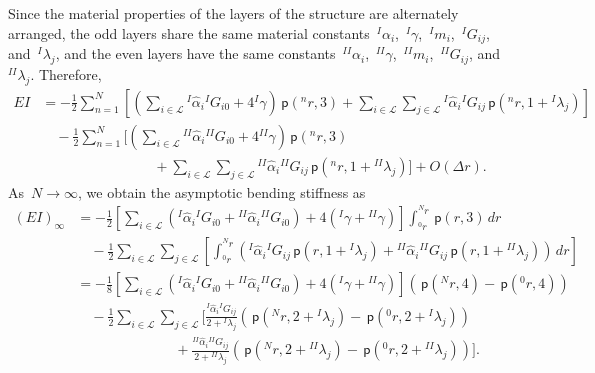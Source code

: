 \documentclass[preprint,10pt,times]{elsarticle}
\numberwithin{equation}{section}
\newcommand{\pr}[1]{\left( #1 \right)}
\newcommand{\p}{\,\mathsf{p}}
\renewcommand{\>}{$\Rightarrow$}
\begin{document}
Since the material properties of the layers of the structure are alternately arranged, the odd layers share the same material constants~${}^{I}\!{\alpha_{i}}$,~${}^{I}\!\gamma$,~${}^{I}\!{m_{i}}$,~${}^{I}\!G_{ij}$, and~${}^{I}\!\lambda_{j}$, and the even layers have the same constants~${}^{II}\!{\alpha_{i}}$,~${}^{II}\!\gamma$,~${}^{II}\!{m_{i}}$,~${}^{II}\!G_{ij}$, and~${}^{II}\!\lambda_{j}$. Therefore,
\begin{equation}
\begin{aligned}
	EI & =  - \frac{1}{2} \sum_{n=1}^{N} \left[ \left( \sum_{i \in \mathcal{L}} {}^{I}\!\hat{\alpha}_{i} {}^{I}\!G_{i0} + 4{}^{I}\!\gamma \right) \p\pr{{}^{n}\!{r},3}+ \sum_{i \in \mathcal{L}} \sum_{j \in \mathcal{L}} {}^{I}\!\hat{\alpha}_{i} {}^{I}\!G_{ij} \p\pr{{}^{n}\!{r},1 + {}^{I}\!\lambda_{j}} \right] \\
	 & \quad - \frac{1}{2} \sum_{n=1}^{N} \biggr[ \left( \sum_{i \in \mathcal{L}} {}^{II}\!\hat{\alpha}_{i} {}^{II}\!G_{i0} + 4{}^{II}\!\gamma \right) \p\pr{{}^{n}\!{r},3} \\
	  & \qquad \qquad \qquad \qquad + \sum_{i \in \mathcal{L}} \sum_{j \in \mathcal{L}} {}^{II}\!\hat{\alpha}_{i} {}^{II}\!G_{ij} \p\pr{{}^{n}\!{r},1 + {}^{II}\!\lambda_{j}} \biggr] + O(\Delta r).
\end{aligned}
\end{equation}
As~$N \to \infty$, we obtain the asymptotic bending stiffness as
\begin{equation}
\begin{aligned}
	(EI)_{\infty} & =  - \frac{1}{2} \left[ \sum_{i \in \mathcal{L}} \left( {}^{I}\!\hat{\alpha}_{i} {}^{I}\!G_{i0} + {}^{II}\!\hat{\alpha}_{i} {}^{II}\!G_{i0} \right) + 4\left( {}^{I}\!\gamma +{}^{II}\!\gamma \right) \right] \int_{{}^{0}\!{r}}^{{}^{N}\!{r}} \p\pr{r,3} \, dr \\
	& \quad - \frac{1}{2} \sum_{i \in \mathcal{L}} \sum_{j \in \mathcal{L}} \left[ \int_{{}^{0}\!{r}}^{{}^{N}\!{r}} \left( {}^{I}\!\hat{\alpha}_{i} {}^{I}\!G_{ij} \p\pr{r,1 + {}^{I}\!\lambda_{j}} + {}^{II}\!\hat{\alpha}_{i} {}^{II}\!G_{ij}  \p\pr{r,1 + {}^{II}\!\lambda_{j}} \right) \, dr \right] \\
	& = - \frac{1}{8} \left[ \sum_{i \in \mathcal{L}} \left( {}^{I}\!\hat{\alpha}_{i} {}^{I}\!G_{i0} + {}^{II}\!\hat{\alpha}_{i} {}^{II}\!G_{i0} \right) + 4\left( {}^{I}\!\gamma +{}^{II}\!\gamma \right) \right] \left( \p\pr{{}^{N}\!{r},4} - \p\pr{{}^{0}\!{r},4} \right) \\
	& \quad - \frac{1}{2} \sum_{i \in \mathcal{L}} \sum_{j \in \mathcal{L}} \biggr[ \frac{{}^{I}\!\hat{\alpha}_{i} {}^{I}\!G_{ij}}{2 + {}^{I}\!\lambda_{j} } \left( \p\pr{{}^{N}\!{r},2 + {}^{I}\!\lambda_{j}} - \p\pr{{}^{0}\!{r},2 + {}^{I}\!\lambda_{j}} \right) \\
	& \qquad \qquad \qquad \quad + \frac{{}^{II}\!\hat{\alpha}_{i} {}^{II}\!G_{ij}}{2 + {}^{II}\!\lambda_{j}} \left( \p\pr{{}^{N}\!{r},2 + {}^{II}\!\lambda_{j}} - \p\pr{{}^{0}\!{r},2 + {}^{II}\!\lambda_{j}} \right) \biggr] .
\end{aligned}
\label{eq:two_mat_no_slip_EI}
\end{equation}
\end{document}
